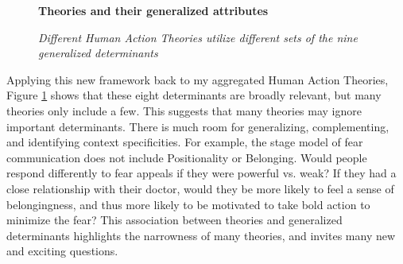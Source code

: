 \documentclass[12 pt]{article}
\begin{document}
 \begin{figure}
 	\centering
 	\textbf{Theories and their generalized attributes}\par \medskip

 	\caption{\textit{Different Human Action Theories utilize different sets of the nine generalized determinants}}
 	 	\label{fig:unifact}
 \end{figure}
 
  Applying this new framework back to my aggregated Human Action Theories, Figure \ref{fig:unifact} shows that these eight determinants are broadly relevant, but many theories only include a few. This suggests that many theories may ignore important determinants. There is much room for generalizing, complementing, and identifying context specificities. For example, the stage model of fear communication does not include Positionality or Belonging. Would people respond differently to fear appeals if they were powerful vs. weak? If they had a close relationship with their doctor, would they be more likely to feel a sense of belongingness, and thus more likely to be motivated to take bold action to minimize the fear? This association between theories and generalized determinants highlights the narrowness of many theories, and invites many new and exciting questions.  
 
\end{document}
